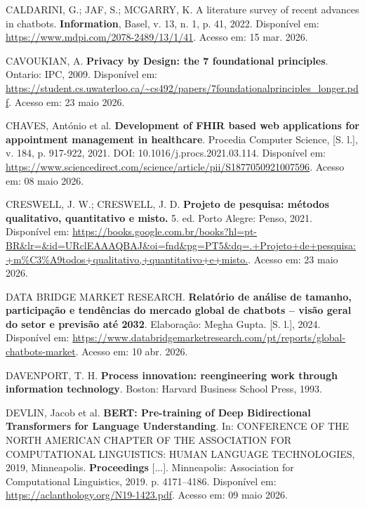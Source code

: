 \documentclass[12pt,a4paper]{extarticle}
\begin{document}
\vspace{0.5cm}\noindent
CALDARINI, G.; JAF, S.; MCGARRY, K. A literature survey of recent advances in chatbots. \textbf{Information}, Basel, v. 13, n. 1, p. 41, 2022. Disponível em: \url{https://www.mdpi.com/2078-2489/13/1/41}. Acesso em: 15 mar. 2026.

\vspace{0.5cm}\noindent
CAVOUKIAN, A. \textbf{Privacy by Design: the 7 foundational principles}. Ontario: IPC, 2009. Disponível em: \url{https://student.cs.uwaterloo.ca/~cs492/papers/7foundationalprinciples_longer.pdf}. Acesso em: 23 maio 2026.

\vspace{0.5cm}\noindent
CHAVES, António et al. \textbf{Development of FHIR based web applications for appointment management in healthcare}. Procedia Computer Science, [S. l.], v. 184, p. 917-922, 2021. DOI: 10.1016/j.procs.2021.03.114. Disponível em: \url{https://www.sciencedirect.com/science/article/pii/S1877050921007596}. Acesso em: 08 maio 2026.

\vspace{0.5cm}\noindent
CRESWELL, J. W.; CRESWELL, J. D. \textbf{Projeto de pesquisa: métodos qualitativo, quantitativo e misto.} 5. ed. Porto Alegre: Penso, 2021. Disponível em: \url{https://books.google.com.br/books?hl=pt-BR&lr=&id=URclEAAAQBAJ&oi=fnd&pg=PT5&dq=.+Projeto+de+pesquisa:+m%C3%A9todos+qualitativo,+quantitativo+e+misto.}. Acesso em: 23 maio 2026.

\vspace{0.5cm}\noindent
DATA BRIDGE MARKET RESEARCH. \textbf{Relatório de análise de tamanho, participação e tendências do mercado global de chatbots -- visão geral do setor e previsão até 2032}. Elaboração: Megha Gupta. [S. l.], 2024. Disponível em: \url{https://www.databridgemarketresearch.com/pt/reports/global-chatbots-market}. Acesso em: 10 abr. 2026.

\vspace{0.5cm}\noindent
DAVENPORT, T. H. \textbf{Process innovation: reengineering work through information technology}. Boston: Harvard Business School Press, 1993.

\vspace{0.5cm}\noindent
DEVLIN, Jacob et al. \textbf{BERT: Pre-training of Deep Bidirectional Transformers for Language Understanding}. In: CONFERENCE OF THE NORTH AMERICAN CHAPTER OF THE ASSOCIATION FOR COMPUTATIONAL LINGUISTICS: HUMAN LANGUAGE TECHNOLOGIES, 2019, Minneapolis. \textbf{Proceedings} [...]. Minneapolis: Association for Computational Linguistics, 2019. p. 4171--4186. Disponível em: \url{https://aclanthology.org/N19-1423.pdf}. Acesso em: 09 maio 2026.
\end{document}
